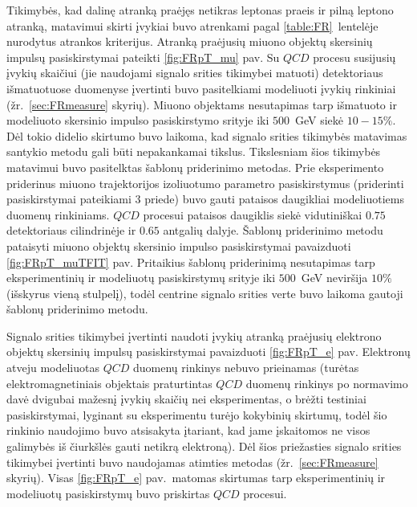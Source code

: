 \documentclass[a4paper, 12pt, oneside]{article}
\newcommand{\QCD}{QC\! D}
\begin{document}
Tikimybės, kad dalinę atranką praėjęs netikras leptonas praeis ir pilną leptono atranką, matavimui skirti įvykiai buvo
atrenkami pagal \ref{table:FR}~lentelėje nurodytus atrankos kriterijus.
Atranką praėjusių miuono objektų skersinių impulsų pasiskirstymai pateikti \ref{fig:FRpT_mu} pav.
Su $\QCD$ procesu susijusių įvykių skaičiui (jie naudojami signalo srities tikimybei matuoti) detektoriaus išmatuotuose
duomenyse įvertinti buvo pasitelkiami modeliuoti įvykių rinkiniai (žr.\ \ref{sec:FRmeasure} skyrių).
Miuono objektams nesutapimas tarp išmatuoto ir modeliuoto skersinio impulso pasiskirstymo srityje iki $500$~GeV siekė $10-15\%$.
Dėl tokio didelio skirtumo buvo laikoma, kad signalo srities tikimybės matavimas santykio metodu gali būti nepakankamai tikslus.
Tikslesniam šios tikimybės matavimui buvo pasitelktas šablonų priderinimo metodas.
Prie eksperimento priderinus miuono trajektorijos izoliuotumo parametro pasiskirstymus (priderinti pasiskirstymai pateikiami 3 priede)
buvo gauti pataisos daugikliai modeliuotiems duomenų rinkiniams.
$\QCD$ procesui pataisos daugiklis siekė vidutiniškai $0.75$ detektoriaus cilindrinėje ir $0.65$ antgalių dalyje.
Šablonų priderinimo metodu pataisyti miuono objektų skersinio impulso pasiskirstymai pavaizduoti \ref{fig:FRpT_muTFIT} pav.
Pritaikius šablonų priderinimą nesutapimas tarp eksperimentinių ir modeliuotų pasiskirstymų srityje iki $500$~GeV neviršija $10\%$
(išskyrus vieną stulpelį), todėl centrine signalo srities verte buvo laikoma gautoji šablonų priderinimo metodu.

Signalo srities tikimybei įvertinti naudoti įvykių atranką praėjusių elektrono objektų skersinių impulsų pasiskirstymai
pavaizduoti \ref{fig:FRpT_e} pav.
Elektronų atveju modeliuotas $\QCD$ duomenų rinkinys nebuvo prieinamas (turėtas elektromagnetiniais objektais praturtintas
$\QCD$ duomenų rinkinys po normavimo davė dvigubai mažesnį įvykių skaičių nei eksperimentas, o brėžti testiniai pasiskirstymai,
lyginant su eksperimentu turėjo kokybinių skirtumų, todėl šio rinkinio naudojimo buvo atsisakyta įtariant, kad jame įskaitomos
ne visos galimybės iš čiurkšlės gauti netikrą elektroną).
Dėl šios priežasties signalo srities tikimybei įvertinti buvo naudojamas atimties metodas (žr.\ \ref{sec:FRmeasure} skyrių).
Visas \ref{fig:FRpT_e} pav.\ matomas skirtumas tarp eksperimentinių ir modeliuotų pasiskirstymų buvo priskirtas $\QCD$ procesui.
\end{document}
